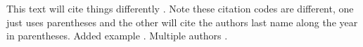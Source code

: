 \documentclass[12pt]{article}
\begin{document}
\begin{flushleft}
This text will cite things differently \cite{cary1967influence}. Note these citation codes are different, one just uses parentheses and the other will cite the authors last name along the year in parentheses. Added example \citep{waltz2001man}. Multiple authors \citep{hibbing2013predisposed}.






\clearpage
\begingroup
	\nocite{*}
	
	
	
	
	
	
\endgroup







\end{flushleft}
\end{document}
